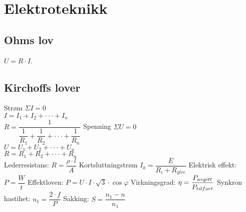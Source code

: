 \section{Elektroteknikk}
\vskip 2.5pt
\subsection*{Ohms lov}
\vskip 2.5pt
$U=R\cdot I$.
\vskip 2.5pt
\subsection*{Kirchoffs lover}
\vskip 2.5pt  
Strøm $\Sigma I=0$\\
\vskip 2.5pt  
$I=I_{1}+I_{2}+\cdot\cdot\cdot+I_{n}$\\
\vskip 2.5pt  
$R=\dfrac{1}{\dfrac{1}{R_{1}}+\dfrac{1}{R_{2}}+\cdot\cdot\cdot+\dfrac{1}{R_{n}}}$ 
\vskip 2pt
 Spenning $\Sigma U=0$\\
\vskip 2.5pt  
$U=U_{1}+U_{2}+\cdot\cdot\cdot+U_{n}$\\
\vskip 2.5pt  
$R=R_{1}+R_{2}+\cdot\cdot\cdot+R_{n}$\\
\vskip 2pt
Lederresistans: $ R=\dfrac{\rho\cdot l}{A}$ 
\vskip 2pt
Kortsluttningstrøm $I_{k}=\dfrac{E}{R_{i}+R_{ytre}}$
\vskip 2pt
Elektrisk effekt: $P=\dfrac{W}{t}$
\vskip 2pt  
Effektloven: $P=U\cdot I\cdot \sqrt{3} \cdot \cos \varphi$
\vskip 2.5pt  
Virkningsgrad: $\eta=\dfrac{P_{avgitt}}{P_{tilf\\ort}}$
\vskip 2.5pt
Synkron hastihet: $n_1=\dfrac{2\cdot f}{P}$
\vskip 2.5pt 
Sakking: $S=\dfrac{n_1-n}{n_1}$
\vskip 2.5pt 
